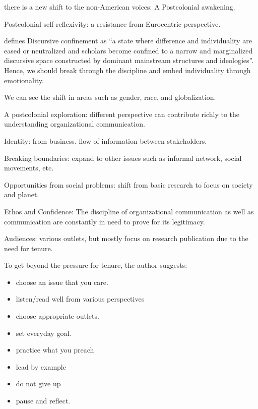 \documentclass[
]{book}
\providecommand{\tightlist}{%
  \setlength{\itemsep}{0pt}\setlength{\parskip}{0pt}}
\begin{document}
there is a new shift to the non-American voices: A Postcolonial awakening.

Postcolonial self-reflexivity: a resistance from Eurocentric perspective.

\citep{Shome_1996} defines Discursive confinement as ``a state where difference and individuality are eased or neutralized and scholars become confined to a narrow and marginalized discursive space constructed by dominant mainstream structures and ideologies''. Hence, we should break through the discipline and embed individuality through emotionality.

We can see the shift in areas such as gender, race, and globalization.

A postcolonial exploration: different perspective can contribute richly to the understanding organizational communication.

\citep{Cheney_2007}

Identity: from business. flow of information between stakeholders.

Breaking boundaries: expand to other issues such as informal network, social movements, etc.

Opportunities from social problems: shift from basic research to focus on society and planet.

Ethos and Confidence: The discipline of organizational communication as well as communication are constantly in need to prove for its legitimacy.

Audiences: various outlets, but mostly focus on research publication due to the need for tenure.

To get beyond the pressure for tenure, the author suggests:

\begin{itemize}
\tightlist
\item
  choose an issue that you care.\\
\item
  listen/read well from various perspectives\\
\item
  choose appropriate outlets.\\
\item
  set everyday goal.\\
\item
  practice what you preach\\
\item
  lead by example\\
\item
  do not give up\\
\item
  pause and reflect.
\end{itemize}
\end{document}
